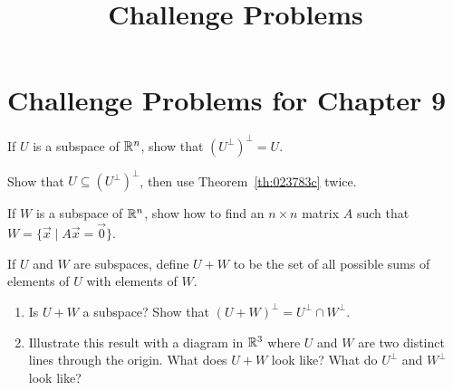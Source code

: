 \documentclass{ximera}
\title{Challenge Problems} \license{CC BY-NC-SA 4.0}
\begin{document}
\begin{abstract}
\end{abstract}
\maketitle

\section*{Challenge Problems for Chapter 9}

\begin{problem}\label{prob:8_1_13}
If $U$ is a subspace of $\mathbb{R}^n$, show that $\left(U^{\perp}\right)^\perp = U$. 
\begin{hint}
Show that $U \subseteq \left(U^{\perp}\right)^\perp$, then use Theorem~\ref{th:023783c} twice.
\end{hint}
\end{problem}


\begin{problem}\label{prob:8_1_14}
If $W$ is a subspace of $\mathbb{R}^n$, show how to find an $n \times n$ matrix $A$ such that $W = \{\vec{x} \mid A\vec{x} = \vec{0}\}$. 


\end{problem}

\begin{problem}\label{prob:8_1_16}
If $U$ and $W$ are subspaces, define $U+W$ to be the set of all possible sums of elements of $U$ with elements of $W$.

\begin{enumerate} 
\item Is $U+W$ a subspace?
Show that $(U + W)^\perp = U^\perp \cap W^\perp$. 
\item Illustrate this result with a diagram in $\mathbb{R}^3$ where $U$ and $W$ are two distinct lines through the origin.  What does $U+W$ look like?  What do $U^{\perp}$ and $W^{\perp}$ look like?
\end{enumerate}
\end{problem}
\end{document}
